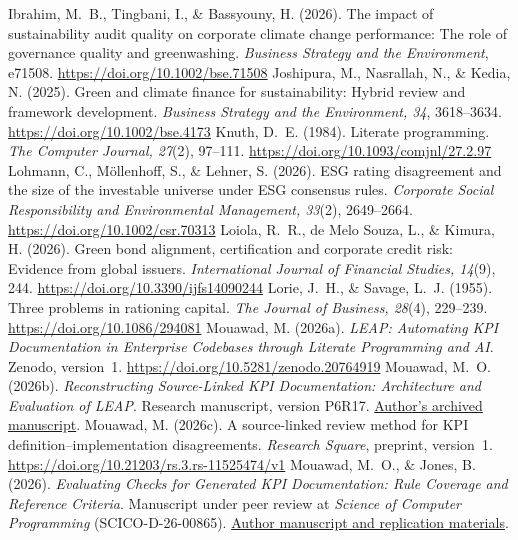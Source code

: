 \begin{thebibliography}{}
 Ibrahim, M.~B., Tingbani, I., \& Bassyouny, H. (2026). The impact of sustainability audit quality on corporate climate change performance: The role of governance quality and greenwashing. \emph{Business Strategy and the Environment}, e71508. \url{https://doi.org/10.1002/bse.71508}
 Joshipura, M., Nasrallah, N., \& Kedia, N. (2025). Green and climate finance for sustainability: Hybrid review and framework development. \emph{Business Strategy and the Environment, 34}, 3618--3634. \url{https://doi.org/10.1002/bse.4173}
 Knuth, D.~E. (1984). Literate programming. \emph{The Computer Journal, 27}(2), 97--111. \url{https://doi.org/10.1093/comjnl/27.2.97}
 Lohmann, C., Möllenhoff, S., \& Lehner, S. (2026). ESG rating disagreement and the size of the investable universe under ESG consensus rules. \emph{Corporate Social Responsibility and Environmental Management, 33}(2), 2649--2664. \url{https://doi.org/10.1002/csr.70313}
 Loiola, R.~R., de Melo Souza, L., \& Kimura, H. (2026). Green bond alignment, certification and corporate credit risk: Evidence from global issuers. \emph{International Journal of Financial Studies, 14}(9), 244. \url{https://doi.org/10.3390/ijfs14090244}
 Lorie, J.~H., \& Savage, L.~J. (1955). Three problems in rationing capital. \emph{The Journal of Business, 28}(4), 229--239. \url{https://doi.org/10.1086/294081}
 Mouawad, M. (2026a). \emph{LEAP: Automating KPI Documentation in Enterprise Codebases through Literate Programming and AI}. Zenodo, version~1. \url{https://doi.org/10.5281/zenodo.20764919}
 Mouawad, M.~O. (2026b). \emph{Reconstructing Source-Linked KPI Documentation: Architecture and Evaluation of LEAP}. Research manuscript, version P6R17. \href{https://github.com/Meshaal-Mouawad/LEAP-Paper1-Evidence/blob/a20b243683a262fd43987013117120c313ec8fa8/SCP_P6R17/01_Manuscript_SCP_P6R17.pdf}{Author's archived manuscript}.
 Mouawad, M. (2026c). A source-linked review method for KPI definition--implementation disagreements. \emph{Research Square}, preprint, version~1. \url{https://doi.org/10.21203/rs.3.rs-11525474/v1}
 Mouawad, M.~O., \& Jones, B. (2026). \emph{Evaluating Checks for Generated KPI Documentation: Rule Coverage and Reference Criteria}. Manuscript under peer review at \emph{Science of Computer Programming} (SCICO-D-26-00865). \href{https://github.com/Meshaal-Mouawad/Paper_2_JSS/blob/1fe7d8c1efe0e90b036f81ae319fbcffb80a262a/main.pdf}{Author manuscript and replication materials}.

\end{thebibliography}

